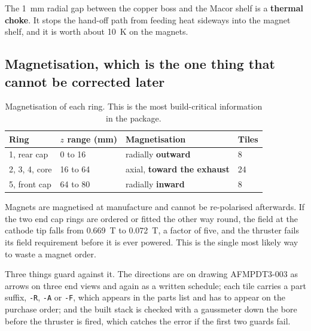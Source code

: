 \documentclass[11pt,a4paper]{article}
\begin{document}
%

The 1~mm radial gap between the copper boss and the Macor shelf is a
\textbf{thermal choke}. It stops the hand-off path from feeding heat sideways
into the magnet shelf, and it is worth about 10~K on the magnets.

\subsection{Magnetisation, which is the one thing that cannot be corrected later}

\begin{table}[H]
\centering
\caption{Magnetisation of each ring. This is the most build-critical
information in the package.}
\label{tab:polarity}
\begin{tabular}{llll}
\toprule
\textbf{Ring} & \textbf{$z$ range (mm)} & \textbf{Magnetisation} & \textbf{Tiles} \\
\midrule
1, rear cap   & 0 to 16   & radially \textbf{outward}          & 8 \\
2, 3, 4, core & 16 to 64  & axial, \textbf{toward the exhaust} & 24 \\
5, front cap  & 64 to 80  & radially \textbf{inward}           & 8 \\
\bottomrule
\end{tabular}
\end{table}

Magnets are magnetised at manufacture and cannot be re-polarised afterwards. If
the two end cap rings are ordered or fitted the other way round, the field at
the cathode tip falls from 0.669~T to 0.072~T, a factor of five, and the
thruster fails its field requirement before it is ever powered. This is the
single most likely way to waste a magnet order.

Three things guard against it. The directions are on drawing AFMPDT3-003 as
arrows on three end views and again as a written schedule; each tile carries a
part suffix, \texttt{-R}, \texttt{-A} or \texttt{-F}, which appears in the
parts list and has to appear on the purchase order; and the built stack is
checked with a gaussmeter down the bore before the thruster is fired, which
catches the error if the first two guards fail.
\end{document}
